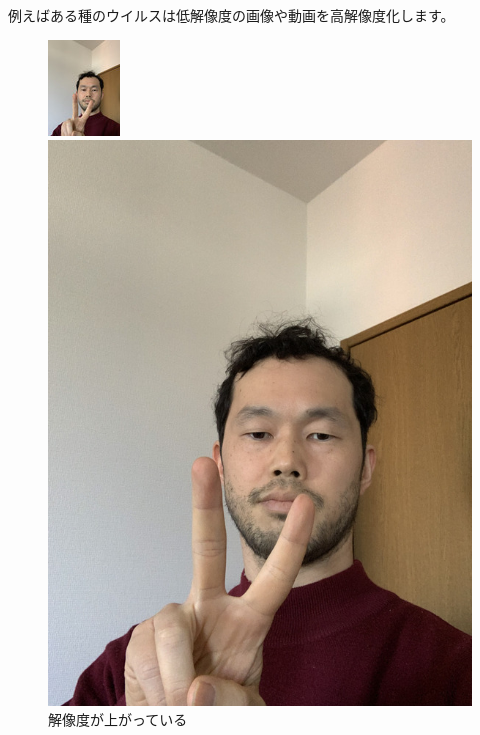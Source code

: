 \documentclass[12pt, unicode]{beamer}
\begin{document}
\begin{frame}

例えばある種のウイルスは低解像度の画像や動画を高解像度化します。

\begin{figure}[htbp]
  \begin{minipage}[b]{0.4\linewidth}
    \centering
    \includegraphics[keepaspectratio, scale=1.2]{pic1_resize.jpg}
  \end{minipage}
  \begin{minipage}[b]{0.18\linewidth}
  \end{minipage}
  \begin{minipage}[b]{0.4\linewidth}
    \centering
    \includegraphics[keepaspectratio, scale=0.15]{pic1.jpg}
  \end{minipage}
  \caption{解像度が上がっている}
\end{figure}

\end{frame}
\end{document}
